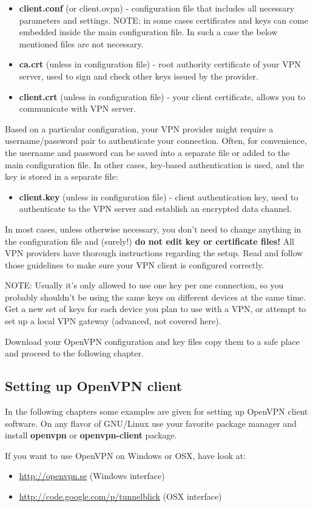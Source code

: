 \begin{itemize}
\item
  \textbf{client.conf} (or client.ovpn) - configuration file that
  includes all necessary parameters and settings. NOTE: in some cases
  certificates and keys can come embedded inside the main configuration
  file. In such a case the below mentioned files are not necessary.
\item
  \textbf{ca.crt} (unless in configuration file) - root authority
  certificate of your VPN server, used to sign and check other keys
  issued by the provider.
\item
  \textbf{client.crt} (unless in configuration file) - your client
  certificate, allows you to communicate with VPN server.
\end{itemize}
Based on a particular configuration, your VPN provider might require a
username/password pair to authenticate your connection. Often, for
convenience, the username and password can be saved into a separate file
or added to the main configuration file. In other cases, key-based
authentication is used, and the key is stored in a separate file:

\begin{itemize}
\item
  \textbf{client.key} (unless in configuration file) - client
  authentication key, used to authenticate to the VPN server and
  establish an encrypted data channel.
\end{itemize}
In most cases, unless otherwise necessary, you don't need to change
anything in the configuration file and (surely!) \textbf{do not edit key
or certificate files!} All VPN providers have thorough instructions
regarding the setup. Read and follow those guidelines to make sure your
VPN client is configured correctly.

NOTE: Usually it's only allowed to use one key per one connection, so
you probably shouldn't be using the same keys on different devices at
the same time. Get a new set of keys for each device you plan to use
with a VPN, or attempt to set up a local VPN gateway (advanced, not
covered here).

Download your OpenVPN configuration and key files copy them to a safe
place and proceed to the following chapter.

\subsection{Setting up OpenVPN client}

In the following chapters some examples are given for setting up OpenVPN
client software. On any flavor of GNU/Linux use your favorite package
manager and install \textbf{openvpn} or \textbf{openvpn-client} package.

If you want to use OpenVPN on Windows or OSX, have look at:

\begin{itemize}
\item
  \href{http://openvpn.se}{http://openvpn.se} (Windows interface)
\item
  \href{http://code.google.com/p/tunnelblick}{http://code.google.com/p/tunnelblick}
  (OSX interface)
\end{itemize}
